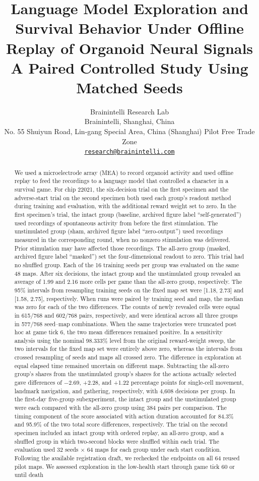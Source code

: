 \documentclass{article}
\title{Language Model Exploration and Survival Behavior Under Offline Replay of Organoid Neural Signals\\ A Paired Controlled Study Using Matched Seeds}
\author{Brainintelli Research Lab \\
\normalfont Brainintelli, Shanghai, China \\
\small No. 55 Shuiyun Road, Lin-gang Special Area, China (Shanghai) Pilot Free Trade Zone \\
\href{mailto:research@brainintelli.com}{\texttt{research@brainintelli.com}}}
\begin{document}
\maketitle
\begin{abstract}
We used a microelectrode array (MEA) to record organoid activity and used offline replay to feed the recordings to a language model that controlled a character in a survival game. For chip 22021, the six-decision trial on the first specimen and the adverse-start trial on the second specimen both used each group's readout method during training and evaluation, with the additional reward weight set to zero. In the first specimen's trial, the intact group (baseline, archived figure label “self-generated”) used recordings of spontaneous activity from before the first stimulation. The unstimulated group (sham, archived figure label “zero-output”) used recordings measured in the corresponding round, when no nonzero stimulation was delivered. Prior stimulation may have affected those recordings. The all-zero group (masked, archived figure label “masked”) set the four-dimensional readout to zero. This trial had no shuffled group. Each of the 16 training seeds per group was evaluated on the same 48 maps.  After six decisions, the intact group and the unstimulated group revealed an average of 1.99 and 2.16 more cells per game than the all-zero group, respectively. The 95\% intervals from resampling training seeds on the fixed map set were [1.18, 2.73] and [1.58, 2.75], respectively. When runs were paired by training seed and map, the median was zero for each of the two differences. The counts of newly revealed cells were equal in 615/768 and 602/768 pairs, respectively, and were identical across all three groups in 577/768 seed--map combinations. When the same trajectories were truncated post hoc at game tick 6, the two mean differences remained positive. In a sensitivity analysis using the nominal 98.333\% level from the original reward-weight sweep, the two intervals for the fixed map set were entirely above zero, whereas the intervals from crossed resampling of seeds and maps all crossed zero. The difference in exploration at equal elapsed time remained uncertain on different maps.  Subtracting the all-zero group's shares from the unstimulated group's shares for the actions actually selected gave differences of \ensuremath{-}2.69, +2.28, and +1.22 percentage points for single-cell movement, landmark navigation, and gathering, respectively, with 4,608 decisions per group. In the first-day five-group subexperiment, the intact group and the unstimulated group were each compared with the all-zero group using 384 pairs per comparison. The timing component of the score associated with action duration accounted for 84.3\% and 95.9\% of the two total score differences, respectively.  The trial on the second specimen included an intact group with ordered replay, an all-zero group, and a shuffled group in which two-second blocks were shuffled within each trial. The evaluation used 32 seeds \ensuremath{\times} 64 maps for each group under each start condition. Following the available registration draft, we rechecked the endpoints on all 64 reused pilot maps. We assessed exploration in the low-health start through game tick 60 or until death 
\end{abstract}
\end{document}
